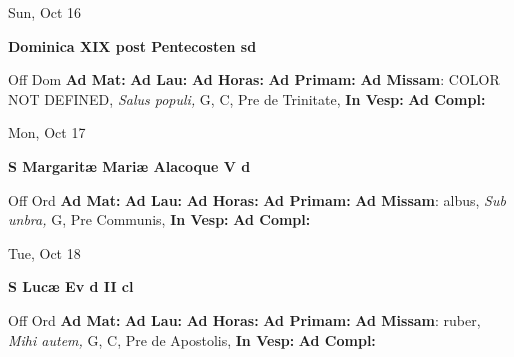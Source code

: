 \documentclass[10pt]{book}
\begin{document}
\begin{center}
\begin{minipage}{3.5in}
\vspace{2em}
\begin{center}Sun, Oct 16
\end{center}
\textbf{ \large Dominica XIX post Pentecosten
\textnormal{\normalsize sd}}

\begin{justify}Off Dom
\textbf{Ad Mat: }
\textbf{Ad Lau: }
\textbf{Ad Horas: }
\textbf{Ad Primam: }\textbf{Ad Missam}: COLOR NOT DEFINED, \textit{Salus populi,} G, C, Pre de Trinitate, 
\textbf{In Vesp: }
\textbf{Ad Compl: }
\end{justify}
\end{minipage}
\end{center}

\begin{center}
\begin{minipage}{3.5in}
\vspace{2em}
\begin{center}Mon, Oct 17
\end{center}
\textbf{ \large S Margaritæ Mariæ Alacoque V
\textnormal{\normalsize d}}

\begin{justify}Off Ord
\textbf{Ad Mat: }
\textbf{Ad Lau: }
\textbf{Ad Horas: }
\textbf{Ad Primam: }\textbf{Ad Missam}: albus, \textit{Sub unbra,} G, Pre Communis, 
\textbf{In Vesp: }
\textbf{Ad Compl: }
\end{justify}
\end{minipage}
\end{center}

\begin{center}
\begin{minipage}{3.5in}
\vspace{2em}
\begin{center}Tue, Oct 18
\end{center}
\textbf{ \large S Lucæ Ev
\textnormal{\normalsize d II cl}}

\begin{justify}Off Ord
\textbf{Ad Mat: }
\textbf{Ad Lau: }
\textbf{Ad Horas: }
\textbf{Ad Primam: }\textbf{Ad Missam}: ruber, \textit{Mihi autem,} G, C, Pre de Apostolis, 
\textbf{In Vesp: }
\textbf{Ad Compl: }
\end{justify}
\end{minipage}
\end{center}
\end{document}
